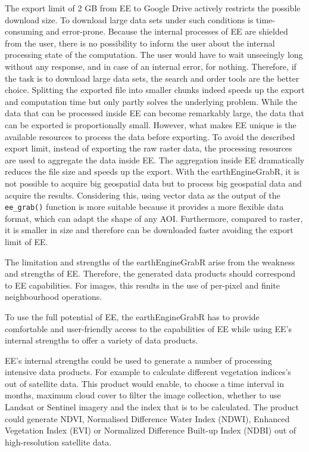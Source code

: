 The export limit of 2 GB from EE to Google Drive actively restricts the possible download size. To download large data sets under such conditions is time-consuming and error-prone. Because the internal processes of EE are shielded from the user, there is no possibility to inform the user about the internal processing state of the computation. The user would have to wait unseeingly long without any response, and in case of an internal error, for nothing.
Therefore, if the task is to download large data sets, the search and order tools are the better choice.
Splitting the exported file into smaller chunks indeed speeds up the export and computation time but only partly solves the underlying problem.
While the data that can be processed inside EE can become remarkably large, the data that can be exported is proportionally small.
However, what makes EE unique is the available resources to process the data before exporting. 
To avoid the described export limit, instead of exporting the raw raster data, the processing resources are used to aggregate the data inside EE.  The aggregation inside EE dramatically reduces the file size and speeds up the export. 
With the earthEngineGrabR, it is not possible to acquire big geospatial data but to process big geospatial data and acquire the results.
Considering this, using vector data as the output of the \texttt{ee\_grab()} function is more suitable because it provides a more flexible data format, which can adapt the shape of any AOI. Furthermore, compared to raster, it is smaller in size and therefore can be downloaded faster avoiding the export limit of EE. 

The limitation and strengths of the earthEngineGrabR arise from the weakness and strengths of EE. Therefore, the generated data products should correspond to EE capabilities. For images, this results in the use of per-pixel and finite neighbourhood operations.

To use the full potential of EE, the earthEngineGrabR has to provide comfortable and user-friendly access to the capabilities of EE while using EE's internal strengths to offer a variety of data products.

EE's internal strengths could be used to generate a number of processing intensive data products. For example to calculate different vegetation indices's out of satellite data. 
This product would enable, to choose a time interval in months, maximum cloud cover to filter the image collection, whether to use Landsat or Sentinel imagery and the index that is to be calculated. The product could generate NDVI, Normalised Difference Water Index (NDWI), Enhanced Vegetation Index (EVI) or Normalized Difference Built-up Index (NDBI) out of high-resolution satellite data.




